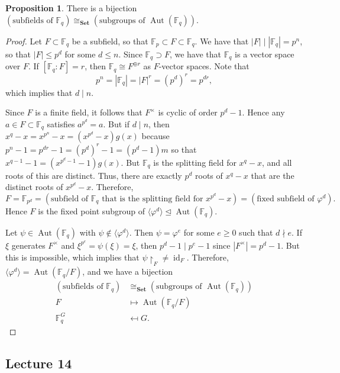 \documentclass[10pt,letterpaper,cm]{nupset}
\theoremstyle{definition}
\theoremstyle{theorem}
\newtheorem{prop}[definition]{Proposition}
\theoremstyle{remark}
\newcommand{\F}{\mathbb F}
\newcommand{\1}{\mathbf{1}}
\newcommand{\0}{\vec 0}
\DeclareMathOperator{\id}{id}
\DeclareMathOperator{\aut}{Aut}
\begin{document}
\begin{prop}
There is a bijection $\left(\text{subfields of } \F_q\right) \cong_{\mathbf{Set}} \left(\text{subgroups of } \aut(\F_q)\right)$.
\end{prop}
\begin{proof}
Let $F \subset \F_q$ be a subfield, so that $\F_p \subset F \subset \F_q$. We have that $\left\lvert{F}\right\rvert \mid \left\lvert{\F_q}\right\rvert =p^n$, so that $\left\lvert{F}\right\rvert \leq p^d$ for some $d\leq n$. Since $\F_q \supset F$, we have that $\F_q$ is a vector space over $F$. If $\left[\F_q : F\right] = r$, then $\F_q \cong F^{\oplus r}$ as $F$-vector spaces. Note that $$p^n = \left\lvert{\F_q}\right\rvert = \left\lvert{F}\right\rvert^r = (p^d)^r = p^{dr},$$ which implies that $d \mid n$.

\medskip

 Since $F$ is a finite field, it follows that $F^{\times}$ is cyclic of order $p^d -1$. Hence any $a\in F\subset \F_q$ satisfies $a^{p^d} =a$. But if $ d\mid n$, then $x^q -x = x^{p^n} -x = (x^{p^d} -x)g(x)$ because $p^n -1 = p^{dr}-1 = (p^d)^r -1 = (p^d -1)m$ so that $x^{q-1}-1 = (x^{p^d -1} -1) g(x)$. But $\F_q$ is the splitting field for $x^q-x$, and all roots of this are distinct. Thus, there are exactly $p^d$ roots of $x^q-x$ that are the distinct roots of $x^{p^d}-x$. Therefore, $$F = \F_{p^d} = \left(\text{subfield of } \F_q \text{ that is the splitting field for } x^{p^d} -x\right)= \left(\text{fixed subfield of } \varphi^d\right).$$ Hence $F$ is the fixed point subgroup of $\langle \varphi^d\rangle \unlhd \aut(\F_q)$.

\medskip

	Let $\psi \in \aut(\F_q)$ with $\psi \notin \langle \varphi^d \rangle$. Then $\psi =\varphi^e$ for some $e\geq 0$ such that $d \nmid e$. If $\xi$ generates $F^{\times}$ and $\xi^{p^e} =\psi(\xi) = \xi$, then $p^d -1 \mid p^e-1$ since $\left\lvert{F^{\times}}\right\rvert=p^d-1$. But this is impossible, which implies that $\psi\restriction_F \ne \id_F$. Therefore, $\langle \varphi^d \rangle =\aut(\F_q/F)$, and we have a bijection 
\begin{align*}
\left(\text{subfields of } \F_q\right) & \cong_{\mathbf{Set}} \left(\text{subgroups of } \aut(\F_q)\right)
\\ F & \mapsto \aut(\F_q/F)
\\  \F_q^G & \mapsfrom G.
\end{align*}
\end{proof}


\subsection{Lecture 14}
\end{document}
